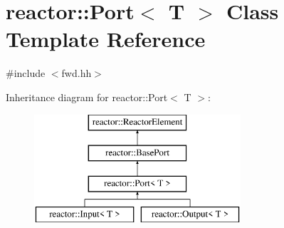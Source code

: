 \hypertarget{classreactor_1_1Port}{}\section{reactor\+:\+:Port$<$ T $>$ Class Template Reference}
\label{classreactor_1_1Port}


{\ttfamily \#include $<$fwd.\+hh$>$}

Inheritance diagram for reactor\+:\+:Port$<$ T $>$\+:\begin{figure}[H]
\begin{center}
\leavevmode
\includegraphics[height=4.000000cm]{classreactor_1_1Port}
\end{center}
\end{figure}
